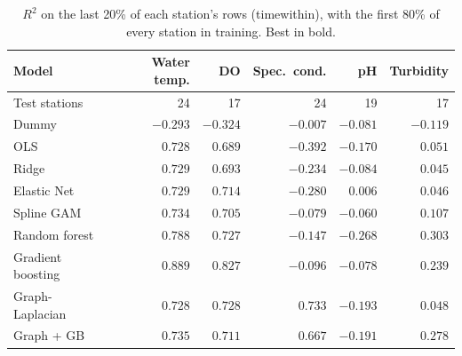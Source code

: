 \documentclass[11pt]{article}
\newcommand{\codeus}{\textunderscore\allowbreak}
\newcommand{\code}[1]{{\ttfamily\let\_\codeus #1}}
\begin{document}
\begin{table}[h]
\centering
\small
\caption{$R^2$ on the last 20\% of each station's rows (\code{time\_within}), with the first 80\% of every station in training. Best in bold.}
\label{tab:split_within}
\begin{tabular}{l rrrrr}
\toprule
Model & Water temp. & DO & Spec.\ cond. & pH & Turbidity \\
\midrule
Test stations & 24 & 17 & 24 & 19 & 17 \\ \midrule
Dummy               & $-0.293$ & $-0.324$ & $-0.007$ & $-0.081$ & $-0.119$ \\
OLS                 & $0.728$ & $0.689$ & $-0.392$ & $-0.170$ & $0.051$ \\
Ridge               & $0.729$ & $0.693$ & $-0.234$ & $-0.084$ & $0.045$ \\
Elastic Net         & $0.729$ & $0.714$ & $-0.280$ & $\mathbf{0.006}$ & $0.046$ \\
Spline GAM          & $0.734$ & $0.705$ & $-0.079$ & $-0.060$ & $0.107$ \\
Random forest       & $0.788$ & $0.727$ & $-0.147$ & $-0.268$ & $\mathbf{0.303}$ \\
Gradient boosting   & $\mathbf{0.889}$ & $\mathbf{0.827}$ & $-0.096$ & $-0.078$ & $0.239$ \\
Graph-Laplacian     & $0.728$ & $0.728$ & $\mathbf{0.733}$ & $-0.193$ & $0.048$ \\
Graph + GB          & $0.735$ & $0.711$ & $0.667$ & $-0.191$ & $0.278$ \\
\bottomrule
\end{tabular}
\end{table}
\end{document}
